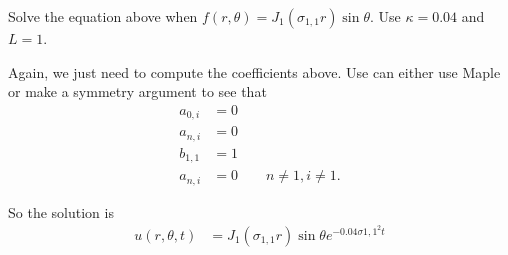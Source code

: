 \begin{example}
Solve the equation above when $f(r,\theta) = J_1(\sigma_{1,1} r) \sin \theta$.  Use $\kappa=0.04$ and $L=1$.

\solution

Again, we just need to compute the coefficients above.  Use can either use Maple or make a symmetry argument to see that
%
\begin{align*}
a_{0,i} & = 0 \\
a_{n,i} & = 0 \\
b_{1,1} & = 1 \\
a_{n,i} & = 0 \qquad n \neq 1, i \neq 1.
\end{align*}

So the solution is
%
\begin{align*}
u(r, \theta,t) & = J_1(\sigma_{1,1} r) \sin \theta e^{-0.04 \sigma{1,1}^2 t}
\end{align*}

\end{example}

